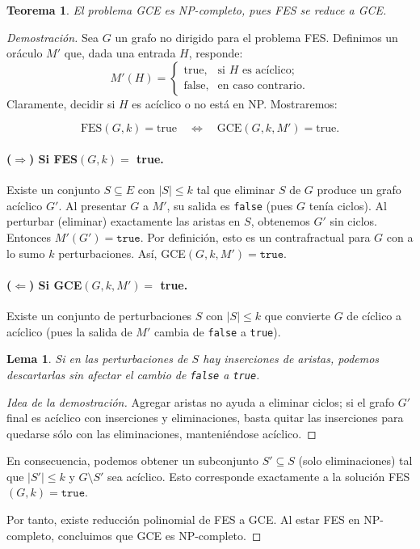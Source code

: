 \documentclass[a4paper]{article}
\newtheorem{theorem}{Teorema}
\newtheorem{lemma}{Lema}
\begin{document}
\begin{theorem}\label{thm:NP}
El problema GCE es NP-completo, pues FES se reduce a GCE.  
\end{theorem}

\begin{proof}[Demostración]
Sea $G$ un grafo no dirigido para el problema FES.  
Definimos un oráculo $M'$ que, dada una entrada $H$, responde:
\[
 M'(H) = 
 \begin{cases}
   \text{true}, & \text{si }H\text{ es acíclico;}\\
   \text{false}, & \text{en caso contrario.}
 \end{cases}
\]
Claramente, decidir si $H$ es acíclico o no está en NP.  
Mostraremos:

\[
\text{FES}(G,k) = \text{true} 
\quad \Longleftrightarrow \quad
\text{GCE}(G, k, M') = \text{true}.
\]

\paragraph{($\Rightarrow$) Si FES$(G,k) =$ true.}
Existe un conjunto $S \subseteq E$ con $|S|\leq k$ tal que eliminar $S$ de $G$ produce un grafo acíclico $G'$.  
Al presentar $G$ a $M'$, su salida es \texttt{false} (pues $G$ tenía ciclos).  
Al perturbar (eliminar) exactamente las aristas en $S$, obtenemos $G'$ sin ciclos.  
Entonces $M'(G') = \texttt{true}$.  
Por definición, esto es un contrafractual para $G$ con a lo sumo $k$ perturbaciones.  
Así, GCE$(G,k,M') = \texttt{true}$.

\paragraph{($\Leftarrow$) Si GCE$(G, k, M') =$ true.}
Existe un conjunto de perturbaciones $S$ con $|S| \leq k$ que convierte $G$ de cíclico a acíclico (pues la salida de $M'$ cambia de \texttt{false} a \texttt{true}).  

\begin{lemma}\label{lemma:eliminar_aristas}
Si en las perturbaciones de $S$ hay inserciones de aristas, podemos descartarlas sin afectar el cambio de \texttt{false} a \texttt{true}. 
\end{lemma}
\begin{proof}[Idea de la demostración]
Agregar aristas no ayuda a eliminar ciclos; si el grafo $G'$ final es acíclico con inserciones y eliminaciones, basta quitar las inserciones para quedarse sólo con las eliminaciones, manteniéndose acíclico.  
\end{proof}

En consecuencia, podemos obtener un subconjunto $S'\subseteq S$ (solo eliminaciones) tal que $|S'|\le k$ y $G\setminus S'$ sea acíclico.  
Esto corresponde exactamente a la solución FES$(G,k)=\texttt{true}$.  

\noindent
Por tanto, existe reducción polinomial de FES a GCE.  
Al estar FES en NP-completo, concluimos que GCE es NP-completo.  

\end{proof}
\end{document}
